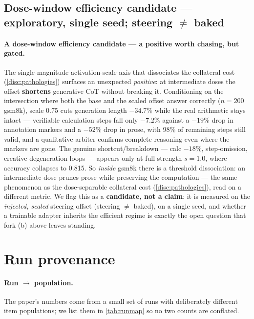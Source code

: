 \subsection{Dose-window efficiency candidate --- exploratory, single seed;
steering ${\neq}$ baked}\label{app:dose}

\paragraph{A dose-window efficiency candidate --- a positive worth chasing, but
gated.}
The single-magnitude activation-scale axis that dissociates the collateral cost
(\cref{disc:pathologies}) surfaces an unexpected \emph{positive}: at intermediate
doses the offset \textbf{shortens} generative CoT without breaking it. Conditioning
on the intersection where both the base and the scaled offset answer correctly
($n{=}200$ gsm8k), scale 0.75 cuts generation length $\mathbf{-34.7\%}$ while the
real arithmetic stays intact --- verifiable calculation steps fall only
$\mathbf{-7.2\%}$ against a $-19\%$ drop in \code{<<\ldots>>} annotation markers
and a $-52\%$ drop in prose, with 98\% of remaining steps still valid, and a
qualitative arbiter confirms complete reasoning even where the \code{<<>>} markers
are gone. The genuine shortcut/breakdown --- calc $-18\%$, step-omission,
creative-degeneration loops --- appears only at full strength $s{=}1.0$, where
accuracy collapses to 0.815. So \emph{inside} gsm8k there is a threshold
dissociation: an intermediate dose prunes prose while preserving the computation
--- the same phenomenon as the dose-separable collateral cost
(\cref{disc:pathologies}), read on a different metric. We flag this as a
\textbf{candidate, not a claim}: it is measured on the \emph{injected, scaled}
steering offset (steering ${\neq}$ baked), on a single seed, and whether a
trainable adapter inherits the efficient regime is exactly the open question that
fork (b) above leaves standing.

\section{Run provenance}\label{app:provenance}

\paragraph{Run $\rightarrow$ population.}
The paper's numbers come from a small set of runs with deliberately different item
populations; we list them in \cref{tab:runmap} so no two counts are conflated.


